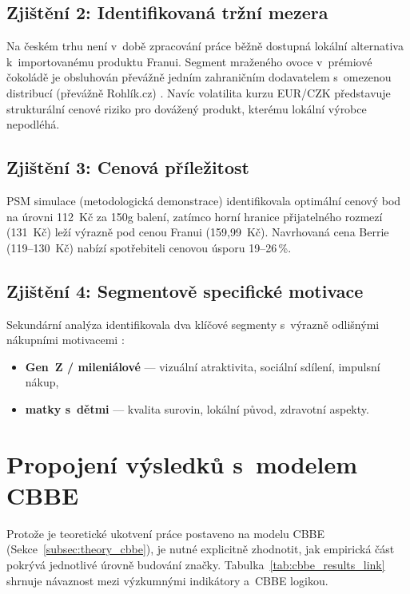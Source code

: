 \subsection{Zjištění 2: Identifikovaná tržní mezera}

Na českém trhu není v~době zpracování práce běžně dostupná lokální alternativa k~importovanému produktu Franui. Segment mraženého ovoce v~prémiové čokoládě je obsluhován převážně jedním zahraničním dodavatelem s~omezenou distribucí (převážně Rohlík.cz) \parencite{rohlik_franui_2026}. Navíc volatilita kurzu EUR/CZK \parencite{cnb_kurzy_2026} představuje strukturální cenové riziko pro dovážený produkt, kterému lokální výrobce nepodléhá.

\subsection{Zjištění 3: Cenová příležitost}

PSM simulace (metodologická demonstrace) identifikovala optimální cenový bod na úrovni 112~Kč za 150g balení, zatímco horní hranice přijatelného rozmezí (131~Kč) leží výrazně pod cenou Franui (159,99~Kč). Navrhovaná cena Berrie (119--130~Kč) nabízí spotřebiteli cenovou úsporu 19--26\,\%.

\subsection{Zjištění 4: Segmentově specifické motivace}

Sekundární analýza identifikovala dva klíčové segmenty s~výrazně odlišnými nákupními motivacemi \parencite{solomon_2020, vysekalova_2011}:
\begin{itemize}
  \item \textbf{Gen~Z / mileniálové} — vizuální atraktivita, sociální sdílení, impulsní nákup,
  \item \textbf{matky s~dětmi} — kvalita surovin, lokální původ, zdravotní aspekty.
\end{itemize}

\section{Propojení výsledků s~modelem CBBE}
\label{sec:res_cbbe_link}

Protože je teoretické ukotvení práce postaveno na modelu CBBE (Sekce~\ref{subsec:theory_cbbe}), je nutné explicitně zhodnotit, jak empirická část pokrývá jednotlivé úrovně budování značky. Tabulka~\ref{tab:cbbe_results_link} shrnuje návaznost mezi výzkumnými indikátory a~CBBE logikou.

